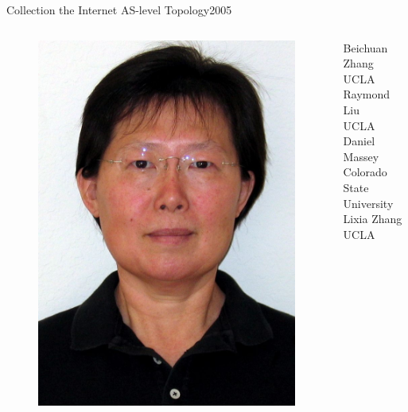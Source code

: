 \documentclass[ngerman,compress,hyperref={bookmarks}]{beamer}
\begin{document}
\begin{frame}{Collection the Internet AS-level Topology}{2005}
\begin{columns}[c]
\begin{column}{0.08\textwidth}
\begin{figure}
   \includegraphics[width=1\textwidth]{images/zhang_l}
  \end{figure}
 \end{column}
 \begin{column}{0.3\textwidth}
  {\scriptsize Beichuan Zhang\\
  \vspace{0.1cm}
  UCLA\\
\vspace{0.7cm}
  Raymond Liu\\
\vspace{0.1cm}
UCLA\\
\vspace{0.3cm}
  Daniel Massey\\
\vspace{0.1cm}
  Colorado State University\\
\vspace{0.3cm}
  Lixia Zhang\\
\vspace{0.1cm}
  UCLA}
 \end{column}
\end{columns}
\end{frame}
\end{document}
